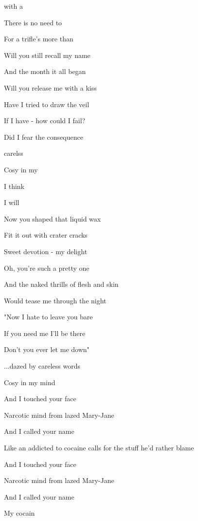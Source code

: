 

\zs

 with a                                 

There is no need to 

For a trifle's more than 
\ks

\zs
Will you still recall my name

And the month it all began

Will you release me with a kiss
\ks

\zs
Have I tried to draw the veil

If I have - how could I fail?

Did I fear the consequence
\ks

\zr
{} carelss          

Cosy in my  

             

I think          

I will 
\kr

\zs
Now you shaped that liquid wax

Fit it out with crater cracks

Sweet devotion - my delight
\ks

\zs
Oh, you're such a pretty one

And the naked thrills of flesh and skin

Would tease me through the night
\ks

\zs
"Now I hate to leave you bare

If you need me I'll be there

Don't you ever let me down"
\ks

\zs
...dazed by careless words

Cosy in my mind
\ks

\zs
And I touched your face

Narcotic mind from lazed Mary-Jane
\ks

\zs
And I called your name

Like an addicted to cocaine calls for the stuff he'd rather blame
\ks

\zs
And I touched your face

Narcotic mind from lazed Mary-Jane
\ks

\zs
And I called your name

My cocain 
\ks

\kp

